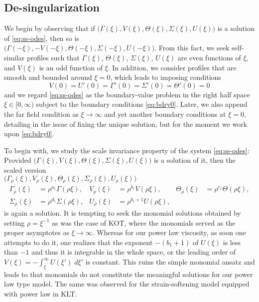 \documentclass[a4paper,11pt]{article}
\begin{document}
\subsection{De-singularization}
We begin by observing that if $\big(\Gamma(\xi), V(\xi), \Theta(\xi), \Sigma(\xi), U(\xi)\big)$ is a solution of \eqref{eq:ss-odes}, then so is \\$\big(\Gamma(-\xi), -V(-\xi), \Theta(-\xi), \Sigma(-\xi), U(-\xi)\big)$. From this fact, we seek self-similar profiles such that $\Gamma(\xi)$, $\Theta(\xi)$, $\Sigma(\xi)$, $U(\xi)$ are even functions of $\xi$, and $V(\xi)$ is an odd function of $\xi$. In addition, we consider profiles that are smooth and bounded around $\xi=0$, which leads to imposing conditions
\begin{equation}
 V(0)=U'(0)=\Gamma'(0)=\Sigma'(0)=\Theta'(0)=0 \label{eq:bdry0}
\end{equation}
and we regard \eqref{eq:ss-odes} as the boundary-value problem in the right half space $\xi \in [0,\infty)$ subject to the boundary conditions \eqref{eq:bdry0}. Later, we also append the far field condition as $\xi \rightarrow \infty$ and yet another boundary conditions at $\xi=0$, detailing in the issue of fixing the unique solution, but for the moment we work upon \eqref{eq:bdry0}.

To begin with, we study the scale invariance property of the system \eqref{eq:ss-odes}: \\Provided $\big(\Gamma(\xi), V(\xi), \Theta(\xi), \Sigma(\xi), U(\xi)\big)$ is a solution of it, then the scaled version \\$\big(\Gamma_\rho(\xi), V_\rho(\xi), \Theta_\rho(\xi), \Sigma_\rho(\xi), U_\rho(\xi)\big)$
\begin{align*}
 \Gamma_\rho(\xi)&=\rho^{a_1}\Gamma(\rho\xi), & V_\rho(\xi)&=\rho^{b_1}V(\rho\xi), & \Theta_\rho(\xi)&=\rho^{c_1}\Theta(\rho\xi),\\
 \Sigma_\rho(\xi)&=\rho^{d_1}\Sigma(\rho\xi), & U_\rho(\xi)&=\rho^{b_1+1}U(\rho\xi),
\end{align*}
is again a solution. It is tempting to seek the monomial solutions obtained by setting $\rho=\xi^{-1}$ as was the case of KOT, where the monomials served as the proper asymptotes as $\xi \rightarrow \infty$. Whereas for our power law viscosity, as soon one attempts to do it, one realizes that the exponent $-(b_1+1)$ of $U(\xi)$ is less than $-1$ and thus it is integrable in the whole space, or the leading order of $V(\xi) = -\int_\xi^\infty U(\xi') \; d\xi'$ is constant. This ruins the simple monomial ansatz and leads to that monomials do not constitute the meaningful solutions for our power law type model. The same was observed for the strain-softening model equipped with power law in KLT.
\end{document}
